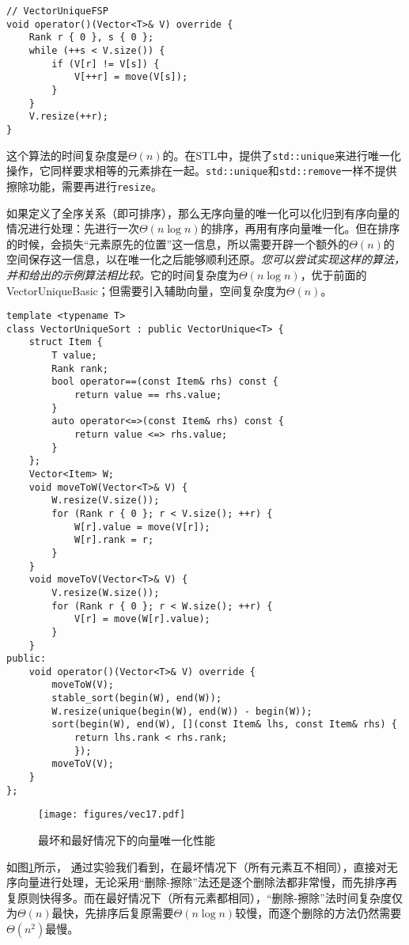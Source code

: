 \begin{lstlisting}
// VectorUniqueFSP
void operator()(Vector<T>& V) override {
    Rank r { 0 }, s { 0 };
    while (++s < V.size()) {
        if (V[r] != V[s]) {
            V[++r] = move(V[s]);
        }
    }
    V.resize(++r);
}
\end{lstlisting}

这个算法的时间复杂度是$\Theta(n)$的。在STL中，提供了\lstinline{std::unique}来进行唯一化操作，它同样要求相等的元素排在一起。\lstinline{std::unique}和\lstinline{std::remove}一样不提供擦除功能，需要再进行\lstinline{resize}。

如果定义了全序关系（即可排序），那么无序向量的唯一化可以化归到有序向量的情况进行处理：先进行一次$\Theta(n\log n)$的排序，再用有序向量唯一化。但在排序的时候，会损失“元素原先的位置”这一信息，所以需要开辟一个额外的$\Theta(n)$的空间保存这一信息，以在唯一化之后能够顺利还原。\textit{您可以尝试实现这样的算法，并和给出的示例算法相比较。}它的时间复杂度为$\Theta(n\log n)$，优于前面的VectorUniqueBasic；但需要引入辅助向量，空间复杂度为$\Theta(n)$。

\begin{lstlisting}
template <typename T>
class VectorUniqueSort : public VectorUnique<T> {
    struct Item {
        T value;
        Rank rank;
        bool operator==(const Item& rhs) const {
            return value == rhs.value;
        }
        auto operator<=>(const Item& rhs) const {
            return value <=> rhs.value;
        }
    };
    Vector<Item> W;
    void moveToW(Vector<T>& V) {
        W.resize(V.size());
        for (Rank r { 0 }; r < V.size(); ++r) {
            W[r].value = move(V[r]);
            W[r].rank = r;
        }
    }
    void moveToV(Vector<T>& V) {
        V.resize(W.size());
        for (Rank r { 0 }; r < W.size(); ++r) {
            V[r] = move(W[r].value);
        }
    }
public:
    void operator()(Vector<T>& V) override {
        moveToW(V);
        stable_sort(begin(W), end(W));
        W.resize(unique(begin(W), end(W)) - begin(W));
        sort(begin(W), end(W), [](const Item& lhs, const Item& rhs) {
            return lhs.rank < rhs.rank;
            });
        moveToV(V);
    }
};
\end{lstlisting}

\begin{figure}
  \centering
  \texttt{[image: figures/vec17.pdf]}
  \caption{最坏和最好情况下的向量唯一化性能}
  \label{fig:vec17}
\end{figure}

如图\ref{fig:vec17}所示，
通过实验我们看到，在最坏情况下（所有元素互不相同），直接对无序向量进行处理，无论采用“删除-擦除”法还是逐个删除法都非常慢，而先排序再复原则快得多。而在最好情况下（所有元素都相同），“删除-擦除”法时间复杂度仅为$\Theta(n)$最快，先排序后复原需要$\Theta(n\log n)$较慢，而逐个删除的方法仍然需要$\Theta(n^2)$最慢。

